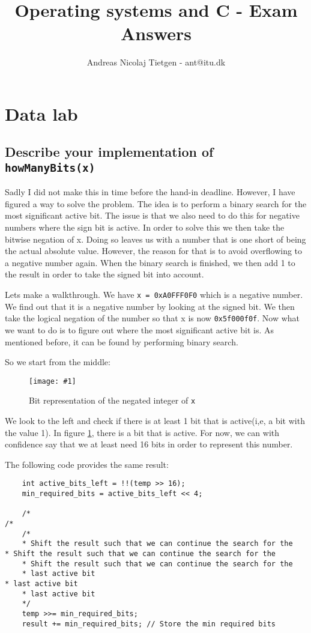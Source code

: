 \documentclass[11pt]{article}
\title{Operating systems and C - Exam Answers}
\author{Andreas Nicolaj Tietgen - ant@itu.dk}
\newcommand{\code}[1]{{\colorbox{lightgray!15}{\color{orange}\texttt{#1}}}}
\newcommand{\centeredpic}[3]{
    \begin{figure}[h]
        \texttt{[image: \#1]}
        \centering
        \caption{#2}
        \label{fig:#3}
    \end{figure}
}
\begin{document}
\maketitle

\tableofcontents

\section{Data lab}

\subsection{Describe your implementation of \code{howManyBits(x)}}
Sadly I did not make this in time before the hand-in deadline. However, I have figured a way to 
solve the problem. The idea is to perform a binary search for the most significant active bit.
The issue is that we also need to do this for negative numbers where the sign bit is active. In order to 
solve this we then take the bitwise negation of x. Doing so leaves us with a number that is one short of being the
actual absolute value. However, the reason for that is to avoid overflowing to a negative number again. 
When the binary search is finished, we then add 1 to the result in order to take the signed bit into account.

Lets make a walkthrough. We have \code{x = 0xA0FFF0F0} which is a negative number.
We find out that it is a negative number by looking at the signed bit. We then take the
logical negation of the number so that x is now \code{0x5f000f0f}. 
Now what we want to do is to figure out where the most significant active bit is. As mentioned before,
it can be found by performing binary search. 

So we start from the middle:

\centeredpic{howmanybits-01.png}{Bit representation of the negated integer of \code{x}}{hmb-step-1}

We look to the left and check if there is at least 1 bit that is active(i,e, a bit with the value 1). In figure \ref{fig:hmb-step-1}, there is a bit that is active.
For now, we can with confidence say that we at least need 16 bits in order to represent this number.

The following code provides the same result:
\begin{lstlisting}
    int active_bits_left = !!(temp >> 16);
    min_required_bits = active_bits_left << 4;
    
    /* 
/* 
    /* 
    * Shift the result such that we can continue the search for the 
* Shift the result such that we can continue the search for the 
    * Shift the result such that we can continue the search for the 
    * last active bit 
* last active bit 
    * last active bit 
    */
    temp >>= min_required_bits;
    result += min_required_bits; // Store the min required bits
\end{lstlisting}
\end{document}
